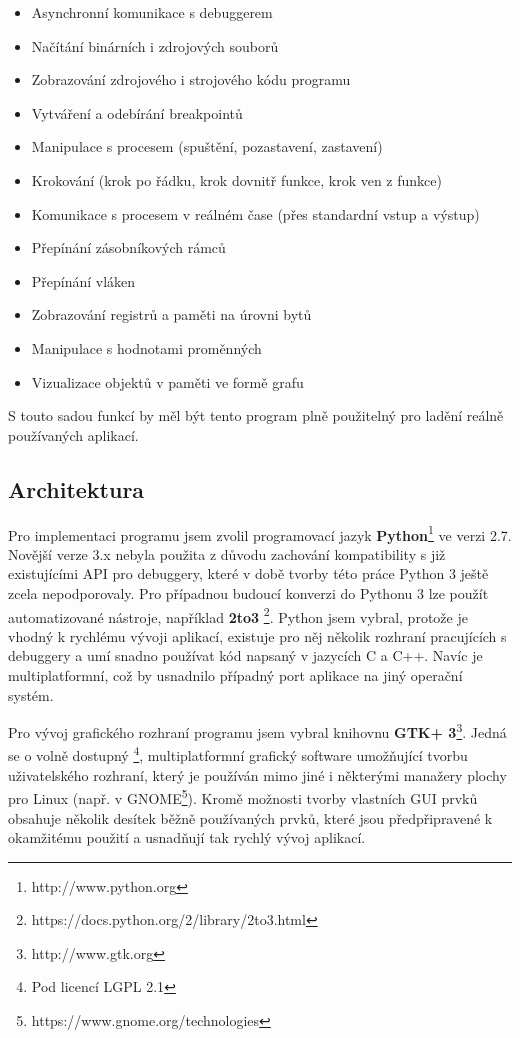 \documentclass[bc,male,python,dept460]{diploma}						%
\newcommand{\parspace}[1][]{
	\ifthenelse{\isempty{#1}}{\vspace{5mm}}{\vspace{#1}}
	\par
}
\begin{document}
	\begin{itemize}
		\item Asynchronní komunikace s debuggerem
		\item Načítání binárních i zdrojových souborů
		\item Zobrazování zdrojového i strojového kódu programu
		\item Vytváření a odebírání breakpointů
		\item Manipulace s procesem (spuštění, pozastavení, zastavení)
		\item Krokování (krok po řádku, krok dovnitř funkce, krok ven z funkce)
		\item Komunikace s procesem v reálném čase (přes standardní vstup a výstup)
		\item Přepínání zásobníkových rámců
		\item Přepínání vláken
		\item Zobrazování registrů a paměti na úrovni bytů
		\item Manipulace s hodnotami proměnných
		\item Vizualizace objektů v paměti ve formě grafu
	\end{itemize}
	
	S touto sadou funkcí by měl být tento program plně použitelný pro ladění reálně používaných aplikací.
	
	\subsection{Architektura}
	\par Pro implementaci programu jsem zvolil programovací jazyk \textbf{Python}\footnote{http://www.python.org} ve verzi 2.7. Novější verze 3.x nebyla použita
	z důvodu zachování kompatibility s již existujícími API pro debuggery, které v době tvorby této práce Python 3 ještě zcela nepodporovaly. Pro případnou
	budoucí konverzi do Pythonu 3 lze použít automatizované nástroje, například \textbf{2to3} \footnote{https://docs.python.org/2/library/2to3.html}.
	Python jsem vybral, protože je vhodný k rychlému vývoji aplikací, existuje pro něj několik rozhraní pracujících s debuggery a umí snadno používat
	kód napsaný v jazycích C a C++. Navíc je multiplatformní, což by usnadnilo případný port aplikace na jiný operační systém.
	
	\parspace Pro vývoj grafického rozhraní programu jsem vybral knihovnu \textbf{GTK+ 3}\footnote{http://www.gtk.org}. Jedná se o volně dostupný
	\footnote{Pod licencí LGPL 2.1}, multiplatformní grafický software umožňující tvorbu uživatelského rozhraní, který je používán mimo jiné i
	některými manažery plochy pro Linux (např. v GNOME\footnote{https://www.gnome.org/technologies}). Kromě možnosti tvorby vlastních
	GUI prvků obsahuje několik desítek běžně používaných prvků, které jsou předpřipravené k okamžitému použití a usnadňují tak rychlý vývoj aplikací.
	
\end{document}
